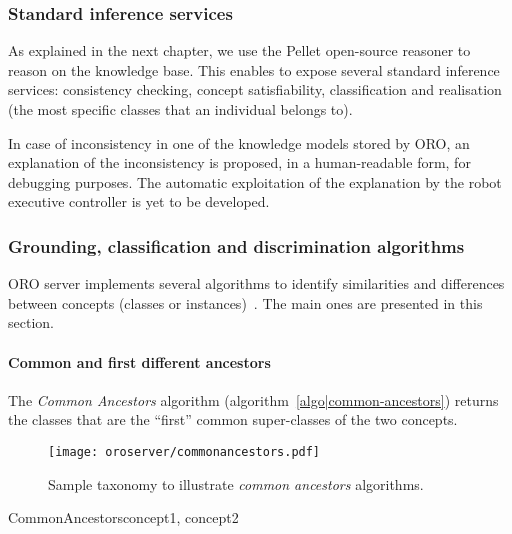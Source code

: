 \subsubsection{Standard inference services}

As explained in the next chapter, we use the Pellet open-source reasoner to
reason on the knowledge base. This enables to expose several standard inference
services: consistency checking, concept satisfiability, classification and
realisation (the most specific classes that an individual belongs to).

In case of inconsistency in one of the knowledge models stored by ORO, an explanation
of the inconsistency is proposed, in a human-readable form, for debugging
purposes. The automatic exploitation of the explanation by the robot executive
controller is yet to be developed.

\subsubsection{Grounding, classification and discrimination algorithms}
\label{sect|discrimination}

ORO server implements several algorithms to identify similarities and
differences between concepts (classes or instances)~\cite{Ros2010b}. The main
ones are presented in this section.

\paragraph{Common and first different ancestors} The \emph{Common Ancestors}
algorithm (algorithm~\ref{algo|common-ancestors}) returns the classes that
are the ``first'' common super-classes of the two concepts.

\begin{figure}
    \centering
    \texttt{[image: oroserver/commonancestors.pdf]}
    \caption{Sample taxonomy to illustrate \emph{common ancestors} algorithms.}
    \label{fig|common-ancestors}
\end{figure}

\small
\begin{pseudocode}[ruled]{CommonAncestors}{concept1, concept2}
\label{algo|common-ancestors}

\BEGIN
{} \GETS {} \cap {} \\
\\
\END

\end{pseudocode}
\normalsize

